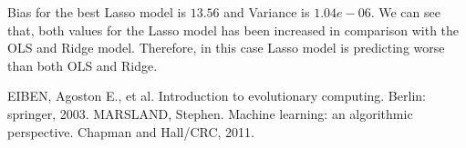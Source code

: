 \documentclass [11pt]{article}
\begin{document}
Bias for the best Lasso model is $13.56$ and Variance is $1.04e-06$. We can see that, both values for the Lasso model has been increased in comparison with the OLS and Ridge model. Therefore, in this case Lasso model is predicting worse than both OLS and Ridge.

\begin{thebibliography}{111}
\raggedright
{} EIBEN, Agoston E., et al. Introduction to evolutionary computing. Berlin: springer, 2003.
 MARSLAND, Stephen. Machine learning: an algorithmic perspective. Chapman and Hall/CRC, 2011.

\end{thebibliography}
\end{document}
